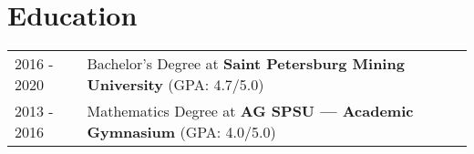 \documentclass[a4paper,12pt]{article}
\begin{document}
\section{Education}
\begin{tabularx}{\linewidth}{@{}l X@{}}	
2016 - 2020 & Bachelor's Degree at \textbf{Saint Petersburg Mining University} \hfill \normalsize (GPA: 4.7/5.0) \\
2013 - 2016 & Mathematics Degree at \textbf{AG SPSU — Academic Gymnasium} \hfill (GPA: 4.0/5.0) \\ 
\end{tabularx}

\vfill
{}
\end{document}
